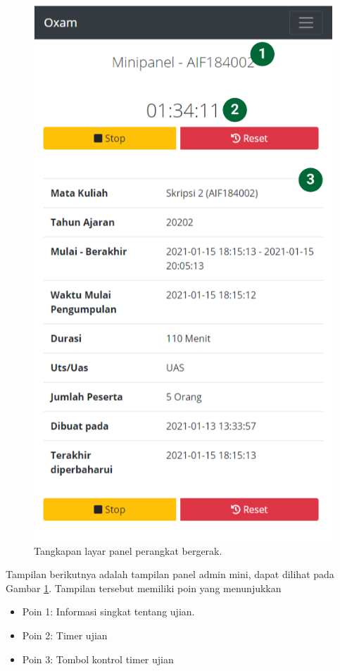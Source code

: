    \begin{figure}
        \centering
        \includegraphics[width=0.3\paperwidth]{Gambar/implemented-interface/admin/ujian-minipanel.png}
        \caption{Tangkapan layar panel perangkat bergerak.}
        \label{fig:screenshot-admin-exam-minipanel}
    \end{figure}
    Tampilan berikutnya adalah tampilan panel admin mini, dapat dilihat pada Gambar
    \ref{fig:screenshot-admin-exam-minipanel}. Tampilan tersebut memiliki poin yang menunjukkan
    \begin{itemize}
        \item Poin 1: Informasi singkat tentang ujian.
        \item Poin 2: Timer ujian
        \item Poin 3: Tombol kontrol timer ujian
    \end{itemize}
    
